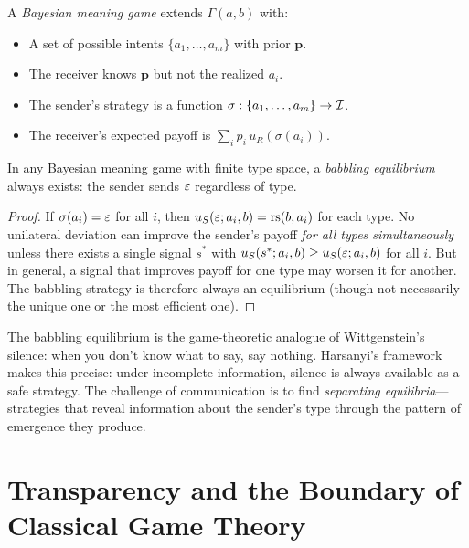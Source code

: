 \begin{definition}
\label{def:bayesian-mg}
A \emph{Bayesian meaning game} extends $\Gamma(a, b)$ with:
\begin{itemize}
\item A set of possible intents $\{a_1, \ldots, a_m\}$ with prior $\mathbf{p}$.
\item The receiver knows $\mathbf{p}$ but not the realized $a_i$.
\item The sender's strategy is a function $\sigma : \{a_1, \ldots, a_m\} \to \mathcal{I}$.
\item The receiver's expected payoff is $\sum_i p_i \, u_R(\sigma(a_i))$.
\end{itemize}
\end{definition}

\begin{theorem}
\label{thm:bayesian-eq}
In any Bayesian meaning game with finite type space, a \emph{babbling
equilibrium} always exists: the sender sends $\varepsilon$ regardless of type.
\end{theorem}

\begin{proof}
If $\sigma(a_i) = \varepsilon$ for all $i$, then $u_S(\varepsilon; a_i, b) = \mathrm{rs}(b, a_i)$
for each type. No unilateral deviation can improve the sender's payoff
\emph{for all types simultaneously} unless there exists a single signal
$s^*$ with $u_S(s^*; a_i, b) \geq u_S(\varepsilon; a_i, b)$ for all $i$. But in
general, a signal that improves payoff for one type may worsen it for another.
The babbling strategy is therefore always an equilibrium (though not necessarily
the unique one or the most efficient one).
\end{proof}

\begin{interpretation}
The babbling equilibrium is the game-theoretic analogue of Wittgenstein's
silence: when you don't know what to say, say nothing. Harsanyi's framework
makes this precise: under incomplete information, silence is always available
as a safe strategy. The challenge of communication is to find \emph{separating
equilibria}---strategies that reveal information about the sender's type
through the pattern of emergence they produce.
\end{interpretation}


\section{Transparency and the Boundary of Classical Game Theory}

